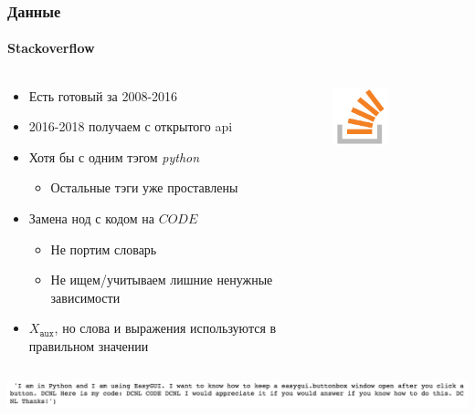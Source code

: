 \documentclass[10pt]{beamer}
\newcommand{\X}[1]{X_{\texttt{#1}}}
\newcommand{\Xaux}{\X{aux}}
\begin{document}
\begin{frame}
\frametitle{Данные}
\framesubtitle{Stackoverflow}

\begin{columns}
    \begin{column}{0.65\textwidth}
        \begin{itemize}
            \item Есть готовый за 2008-2016
            \item 2016-2018 получаем с открытого api
            \item Хотя бы с одним тэгом \textit{python}
            \begin{itemize}
                \item Остальные тэги уже проставлены
            \end{itemize}
            \item Замена нод с кодом на $CODE$
            \begin{itemize}
                \item Не портим словарь
                \item Не ищем/учитываем лишние ненужные зависимости
            \end{itemize}
            \item $\Xaux$, но слова и выражения используются в правильном значении
        \end{itemize}
    \end{column}
    \begin{column}{0.35\textwidth}
        \begin{center}
            \includegraphics[width=0.4\textwidth]{images/stackoverflow.png}
        \end{center}
    \end{column}
\end{columns}

\vskip3mm

\includegraphics[width=\textwidth]{images/stackoverflow_example.png}

\end{frame}
\end{document}
